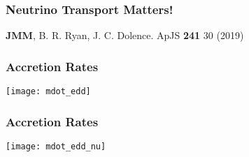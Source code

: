 \documentclass[]{beamer}
\begin{document}
\begin{frame}
  \frametitle{Neutrino Transport Matters!}
  \begin{center}
  \end{center}
  \begin{tiny}
    \textbf{JMM}, B. R. Ryan, J. C. Dolence. ApJS \textbf{241} 30 (2019) 
  \end{tiny}
\end{frame}

\begin{frame}
  \frametitle{Accretion Rates}
  \begin{center}
    \texttt{[image: mdot\_edd]}
  \end{center}
\end{frame}

\begin{frame}
  \frametitle{Accretion Rates}
  \begin{center}
    \texttt{[image: mdot\_edd\_nu]}
  \end{center}
\end{frame}
\end{document}
